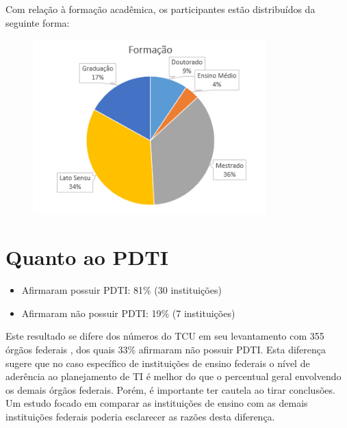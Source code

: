 Com relação à formação acadêmica, os participantes estão distribuídos da seguinte forma:
\begin{figure}[h]
\centering %
\includegraphics[width=9cm]{figuras/apendiceC_formacao.png}
\end{figure}

\section{Quanto ao PDTI}
\begin{itemize}
\item Afirmaram possuir PDTI: 81\% (30 instituições)
\item Afirmaram não possuir PDTI: 19\% (7 instituições)
\end{itemize}

Este resultado se difere dos números do TCU em seu levantamento com 355 órgãos federais \cite{tcu:14}, dos quais 33\% afirmaram não possuir PDTI. Esta diferença sugere que no caso específico de instituições de ensino federais o nível de aderência ao planejamento de TI é melhor do que o percentual geral envolvendo os demais órgãos federais. Porém, é importante ter cautela ao tirar conclusões. Um estudo focado em comparar as instituições de ensino com as demais instituições federais poderia esclarecer as razões desta diferença.

